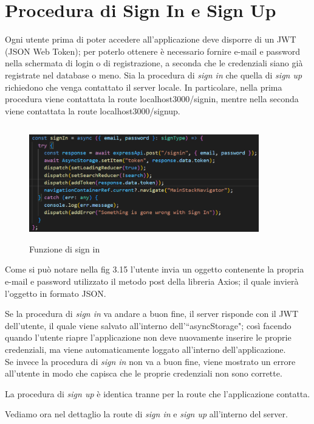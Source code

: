 \section{Procedura di Sign In e Sign Up}
Ogni utente prima di poter accedere all'applicazione deve disporre di un JWT (JSON Web Token); per poterlo ottenere \`e necessario fornire
e-mail e password nella schermata di login o di registrazione, a seconda che le credenziali siano gi\`a registrate nel database o meno.
Sia la procedura di \textit{sign in}  che quella di \textit{sign up} richiedono che venga contattato il server locale. In particolare, nella prima procedura viene 
contattata la route localhost3000/signin, mentre nella seconda viene contattata la route localhost3000/signup.
\begin{figure}[h]
    \centering
    \includegraphics[width=10cm, height=5cm]{images/signInApplication.png}
    \caption[differenzeiteot]{Funzione di sign in}
    \label{fig:sign in}
\end{figure}

Come si pu\`o notare nella fig 3.15 l'utente invia un oggetto contenente la propria e-mail e password utilizzato il metodo post della libreria Axios;
il quale invier\`a l'oggetto in formato JSON.

Se la procedura di \textit{sign in} va andare a buon fine, il server risponde con il JWT dell'utente, il quale viene salvato all'interno dell'``asyncStorage"; cos\`i facendo quando l'utente riapre
l'applicazione non deve nuovamente inserire le proprie credenziali, ma viene automaticamente loggato all'interno dell'applicazione.\\
Se invece la procedura di \textit{sign in} non va a buon fine, viene mostrato un errore all'utente in modo che capisca che le proprie credenziali non sono corrette.

La procedura di \textit{sign up} \`e identica tranne per la route che l'applicazione contatta.

Vediamo ora nel dettaglio la route di \textit{sign in} e \textit{sign up} all'interno del server.
